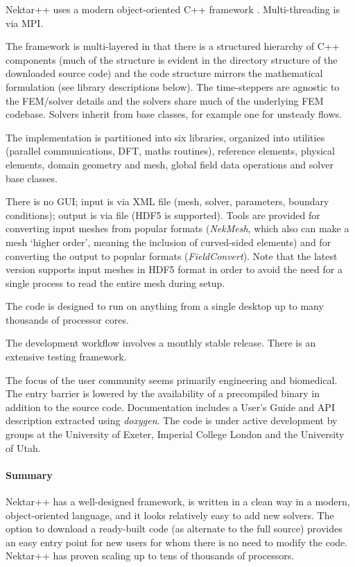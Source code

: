 Nektar++ uses a modern object-oriented C++ framework \cite{Ca15Nekt}.  Multi-threading is via MPI.

The framework is multi-layered in that there is a structured hierarchy of C++ components (much of the structure is evident in the directory structure of the downloaded source code) and the code structure mirrors the mathematical formulation (see library descriptions below).  
The time-steppers are agnostic to the FEM/solver details and the solvers share much of the underlying FEM codebase.  
Solvers inherit from base classes, for example one for unsteady flows.

The implementation is partitioned into six libraries, organized into utilities (parallel communications, DFT, maths routines), reference elements, physical elements, domain geometry and mesh, global field data operations and solver base classes.

There is no GUI; input is via XML file (mesh, solver, parameters, boundary conditions); output is via file (HDF5 is supported).  
Tools are provided for converting input meshes from popular formats ({\it NekMesh}, which also can make a mesh `higher order', meaning the inclusion of curved-sided elements) and for converting the output to popular formats ({\it FieldConvert}).  
Note that the latest version \cite{Mo20Nekt} supports input meshes in HDF5 format in order to avoid the need for a single process to read the entire mesh during setup.

The code is designed to run on anything from a single desktop up to many thousands of processor cores.

The development workflow involves a monthly stable release.  
There is an extensive testing framework.

The focus of the user community seems primarily engineering and biomedical.  
The entry barrier is lowered by the availability of a precompiled binary in addition to the source code.  
Documentation includes a User's Guide and API description extracted using {\it doxygen}.
The code is under active development by groups at the University of Exeter, Imperial College London
and the University of Utah.


\paragraph{Summary}

Nektar++ has a well-designed framework, is written in a clean way in a modern, object-oriented language, and it looks relatively easy to add new solvers.  
The option to download a ready-built code (as alternate to the full source) provides an easy entry point for new users for whom there is no need to modify the code.  Nektar++ has proven scaling up to tens of thousands of processors.

